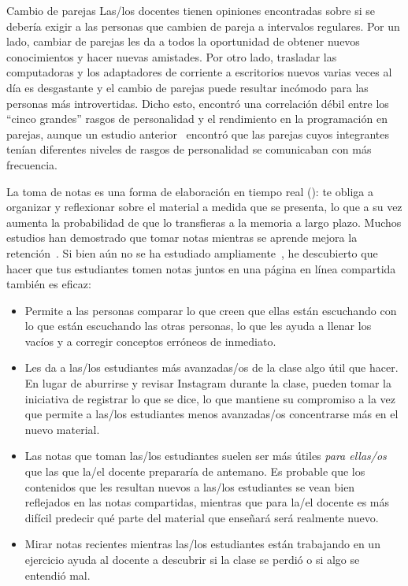 \begin{aside}{Cambio de parejas}
  Las/los docentes tienen opiniones encontradas sobre si se debería exigir a las personas que cambien de pareja a intervalos regulares.
  Por un lado, cambiar de parejas les da a todos la oportunidad de obtener nuevos conocimientos y hacer nuevas amistades.
  Por otro lado,
  trasladar las computadoras y los adaptadores de corriente a escritorios nuevos varias veces al día es desgastante
  y el cambio de parejas puede resultar incómodo para las personas más introvertidas.
  Dicho esto,
  \cite{Hann2010} encontró una correlación débil entre los ``cinco grandes'' rasgos de personalidad 
  y el rendimiento en la programación en parejas,
  aunque un estudio anterior~\cite{Wall2009} encontró que
  las parejas cuyos integrantes tenían diferentes niveles de rasgos de personalidad se comunicaban con más frecuencia.
\end{aside}


La toma de notas es una forma de elaboración en tiempo real ():
te obliga a organizar y reflexionar sobre el material a medida que se presenta,
lo que a su vez aumenta la probabilidad de que lo transfieras a la memoria a largo plazo.
Muchos estudios han demostrado que
tomar notas mientras se aprende mejora la retención~\cite{Aike1975,Boha2011}.
Si bien aún no se ha estudiado ampliamente~\cite{Ornd2015,Yang2015},
he descubierto que hacer que tus estudiantes tomen notas juntos en una página en línea compartida también es eficaz:

\begin{itemize}

\item
  Permite a las personas comparar lo que creen que ellas están escuchando
  con lo que están escuchando las otras personas,
  lo que les ayuda a llenar los vacíos y a corregir conceptos erróneos de inmediato.
 
\item
  Les da a las/los estudiantes más avanzadas/os de la clase algo útil que hacer.
  En lugar de aburrirse y revisar Instagram durante la clase,
  pueden tomar la iniciativa de registrar lo que se dice,
  lo que mantiene su compromiso a la vez que
  permite a las/los estudiantes menos avanzadas/os concentrarse más en el nuevo material.
 
\item
  Las notas que toman las/los estudiantes suelen ser más útiles \emph{para ellas/os}
  que las que la/el docente prepararía de antemano.
  Es probable que los contenidos que les resultan nuevos a las/los estudiantes
  se vean bien reflejados en las notas compartidas,
  mientras que para la/el docente es más difícil predecir qué parte del material
  que enseñará será realmente nuevo.
  
\item
  Mirar notas recientes mientras las/los estudiantes están trabajando en un ejercicio
  ayuda al docente a descubrir si la clase se perdió o si algo se entendió mal.
 
\end{itemize}

